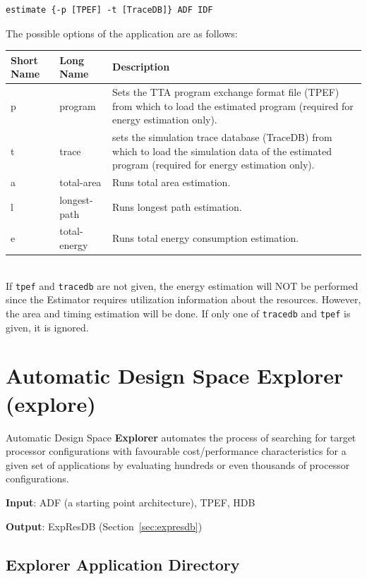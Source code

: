 \documentclass[a4paper,twoside]{tceusermanual}
\begin{document}
\begin{verbatim}
estimate {-p [TPEF] -t [TraceDB]} ADF IDF
\end{verbatim}

The possible options of the application are as follows:\\

\begin{tabular}{p{}p{}
                p{}}
\textbf{Short Name} &\textbf{Long Name} &\textbf{Description} \\
\hline
p & program & Sets the TTA program exchange format file (TPEF) from which to
load the estimated program (required for energy estimation only). \\
t & trace & sets the simulation trace database (TraceDB) from which to load
the simulation data of the estimated program (required for energy estimation
only). \\
a & total-area & Runs total area estimation.\\
l & longest-path & Runs longest path estimation.\\
e & total-energy & Runs total energy consumption estimation.\\
\end{tabular}\\

If \verb|tpef| and \verb|tracedb| are not given, the energy estimation
will NOT be performed since the Estimator requires utilization
information about the resources. However, the area and timing
estimation will be done. If only one of \verb|tracedb| and \verb|tpef|
is given, it is ignored.

\section{Automatic Design Space Explorer (explore)}
\label{section:explore}

Automatic Design Space \textbf{Explorer} automates the
process of searching for target processor configurations with favourable
cost/performance characteristics for a given set of applications by
evaluating hundreds or even thousands of processor configurations.

\textbf{Input}: ADF (a starting point architecture), TPEF, HDB

\textbf{Output}: ExpResDB (Section~\ref{sec:expresdb})

\subsection{Explorer Application Directory}
\end{document}
